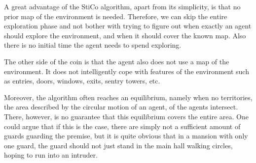A great advantage of the StiCo algorithm, apart from its simplicity, is that no prior map of the environment is needed. Therefore, we can skip the entire exploration phase and not bother with trying to figure out when exactly an agent should explore the environment, and when it should cover the known map. Also there is no initial time the agent needs to spend exploring.

The other side of the coin is that the agent also does not use a map of the environment. It does not intelligently cope with features of the environment such as entries, doors, windows, exits, sentry towers, etc.

Moreover, the algorithm often reaches an equilibrium, namely when no territories, the area described by the circular motion of an agent, of the agents intersect. There, however, is no guarantee that this equilibrium covers the entire area. One could argue that if this is the case, there are simply not a sufficient amount of guards guarding the premise, but it is quite obvious that in a mansion with only one guard, the guard should not just stand in the main hall walking circles, hoping to run into an intruder.

